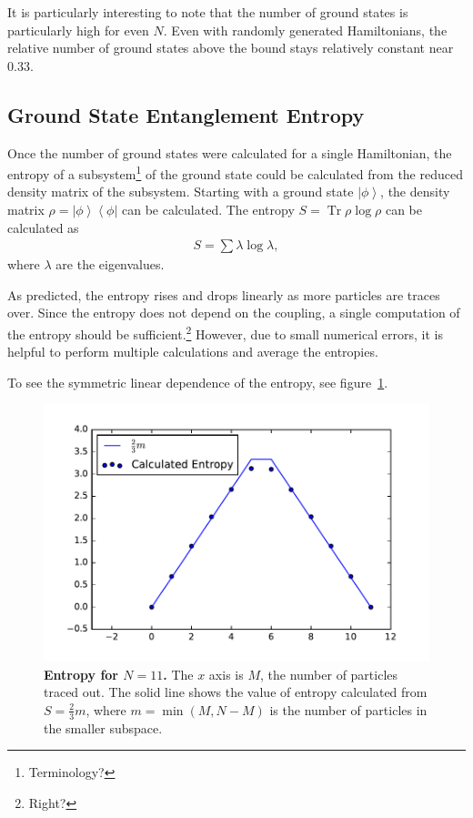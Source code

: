 \documentclass[12pt]{article} %
\newcommand{\ket}[1]{\left|#1\right\rangle}
\newcommand{\bra}[1]{\left\langle#1\right|}
\DeclareMathOperator{\Tr}{Tr}
\begin{document}
It is particularly interesting to note that the number of ground states is particularly high for even $N$. Even with randomly generated Hamiltonians, the relative number of ground states above the bound stays relatively constant near 0.33. 

\subsection{Ground State Entanglement Entropy}

Once the number of ground states were calculated for a single Hamiltonian, the entropy of a subsystem\footnote{Terminology?} of the ground state could be calculated from the reduced density matrix of the subsystem. Starting with a ground state $\ket{\phi}$, the density matrix $\rho = \ket{\phi}\bra{\phi}$ can be calculated. The entropy $S = \Tr\rho\log\rho$ can be calculated as 
\begin{align}
S = \sum \lambda\log\lambda,
\end{align}
where $\lambda$ are the eigenvalues. 

As predicted, the entropy rises and drops linearly as more particles are traces over. Since the entropy does not depend on the coupling, a single computation of the entropy should be sufficient.\footnote{Right?} However, due to small numerical errors, it is helpful to perform multiple calculations and average the entropies. 

To see the symmetric linear dependence of the entropy, see figure~\ref{fig:N11pred_ent}.

\begin{figure}
	\centering
	\includegraphics[width=.5\textwidth]{N11pred_ent}
	\caption{\textbf{Entropy for $N=11$.} The $x$ axis is $M$, the number of particles traced out. The solid line shows the value of entropy calculated from $S=\frac{2}{3}m$, where $m = \min(M,N-M)$ is the number of particles in the smaller subspace. }
	\label{fig:N11pred_ent}
\end{figure}

\printbibliography
\end{document}
